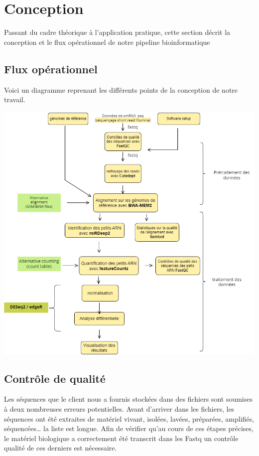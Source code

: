 \chapter{Conception}
Passant du cadre théorique à l'application pratique, cette section décrit la conception et le flux opérationnel de notre pipeline bioinformatique
\section{Flux opérationnel}
Voici un diagramme reprenant les différents points de la conception de notre travail.
\begin{center}
    \includegraphics[scale=0.5]{img/PIPLINE_RNA.png}\\[1cm]
\end{center}

\section{Contrôle de qualité}
Les séquences que le client nous a fournis stockées dans des fichiers sont soumises à deux nombreuses erreurs potentielles. Avant d’arriver dans les fichiers, les séquences ont été extraites de matériel vivant, isolées, lavées, préparées, amplifiés, séquencées… la liste est longue. Afin de vérifier qu’au cours de ces étapes précises, le matériel biologique a correctement été transcrit dans les Fastq un contrôle qualité de ces derniers est nécessaire. 

